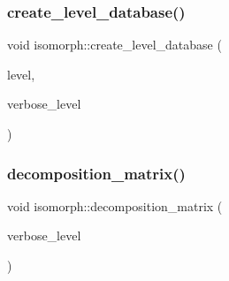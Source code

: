 \mbox{\label{classisomorph_a15a452310bd3189f10f34c7dd7085e69}} 
\subsubsection{\texorpdfstring{create\+\_\+level\+\_\+database()}{create\_level\_database()}}
{\footnotesize\ttfamily void isomorph\+::create\+\_\+level\+\_\+database (\begin{DoxyParamCaption}\item[{\mbox{\hyperlink{galois_8h_a09fddde158a3a20bd2dcadb609de11dc}{I\+NT}}}]{level,  }\item[{\mbox{\hyperlink{galois_8h_a09fddde158a3a20bd2dcadb609de11dc}{I\+NT}}}]{verbose\+\_\+level }\end{DoxyParamCaption})}

\mbox{\label{classisomorph_a3278e4cd7b5270dd7d0501dbd95b66a0}} 
\subsubsection{\texorpdfstring{decomposition\+\_\+matrix()}{decomposition\_matrix()}}
{\footnotesize\ttfamily void isomorph\+::decomposition\+\_\+matrix (\begin{DoxyParamCaption}\item[{\mbox{\hyperlink{galois_8h_a09fddde158a3a20bd2dcadb609de11dc}{I\+NT}}}]{verbose\+\_\+level }\end{DoxyParamCaption})}

\mbox{\label{classisomorph_a51fc3bf5cc3a99282a489b2df37ee24e}} 
